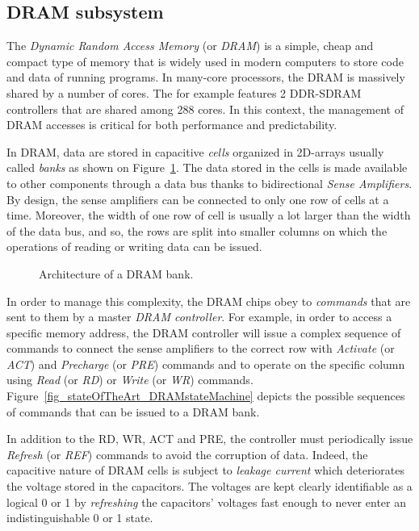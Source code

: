 \documentclass[main.tex]{subfiles}
\begin{document}
\subsection{DRAM subsystem}
\label{sssec_stateOfTheArt_basicsDRAM}
The \emph{Dynamic Random Access Memory} (or \emph{DRAM}) is a simple, cheap and
compact type of memory that is widely used in modern computers to store code
and data of running programs. In many-core processors, the DRAM is massively
shared by a number of cores. The \mppalong for example features 2 DDR-SDRAM
controllers that are shared among 288 cores. In this context, the management of
DRAM accesses is critical for both performance and predictability.

In DRAM, data are stored in capacitive \emph{cells} organized in 2D-arrays
usually called \emph{banks} as shown on Figure~\ref{fig_stateOfTheArt_DRAM}.
The data stored in the cells is made available to other components through a
data bus thanks to bidirectional \emph{Sense Amplifiers}. By design, the sense
amplifiers can be connected to only one row of cells at a time. Moreover, the
width of one row of cell is usually a lot larger than the width of the data
bus, and so, the rows are split into smaller columns on which the operations of
reading or writing data can be issued. 

\begin{figure}
    \centering
    \scalebox{0.6}{}
    \caption{Architecture of a DRAM bank.}
    \label{fig_stateOfTheArt_DRAM}
\end{figure}

In order to manage this complexity, the DRAM chips obey to \emph{commands} that
are sent to them by a master \emph{DRAM controller}. For example, in order to
access a specific memory address, the DRAM controller will issue a complex
sequence of commands to connect the sense amplifiers to the correct row with
\emph{Activate} (or \emph{ACT}) and \emph{Precharge} (or \emph{PRE}) commands
and to operate on the specific column using \emph{Read} (or \emph{RD}) or
\emph{Write} (or \emph{WR}) commands.
Figure~\ref{fig_stateOfTheArt_DRAMstateMachine} depicts the possible sequences
of commands that can be issued to a DRAM bank.

In addition to the RD, WR, ACT and PRE, the controller must periodically issue
\emph{Refresh} (or \emph{REF}) commands to avoid the corruption of data.
Indeed, the capacitive nature of DRAM cells is subject to \emph{leakage
current} which deteriorates the voltage stored in the capacitors. The voltages
are kept clearly identifiable as a logical 0 or 1 by \emph{refreshing} the
capacitors' voltages fast enough to never enter an indistinguishable 0 or 1
state. 
\end{document}
